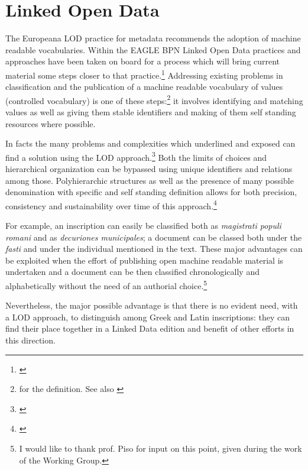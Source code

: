 \documentclass[amsthm,ebook]{saparticle}
\begin{document}
\section{Linked Open Data}
The Europeana LOD practice for metadata recommends the adoption of machine readable vocabularies. Within the EAGLE BPN Linked Open Data practices and approaches have been taken on board for a process which will bring current material some steps closer to that practice.\footnote{\citet{Bizer2009}} Addressing existing problems in classification and the publication of a machine readable vocabulary of values (controlled vocabulary) is one of these steps:\footnote{\citet[4-5]{Harper2012} for the definition. See also \citet{Isaac2012}} it involves identifying and matching values as well as giving them stable identifiers and making of them self standing resources where possible.

In facts the many problems and complexities which \citet{Manzella1987} underlined and exposed can find a solution using the LOD approach.\footnote{\citet{Bizer2009}} Both the limits of choices and hierarchical organization can be bypassed using unique identifiers and relations among those. Polyhierarchic structures as well as the presence of many possible denomination with specific and self standing definition allows for both precision, consistency and sustainability over time of this approach.\footnote{\citet{Harpring2010}} 

For example, an inscription can easily be classified both as \emph{magistrati populi romani} and as \emph{decuriones municipales}; a document can be classed both under the \emph{fasti} and under the individual mentioned in the text. These major advantages can be exploited when the effort of publishing open machine readable material is undertaken and a document can be then classified chronologically and alphabetically without the need of an authorial choice.\footnote{I would like to thank prof. Piso for input on this point, given during the work of the Working Group.}

Nevertheless, the major possible advantage is that there is no evident need, with a LOD approach, to distinguish among Greek and Latin inscriptions: they can find their place together in a Linked Data  edition and benefit of other efforts in this direction.
\end{document}
